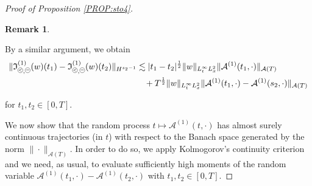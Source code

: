 \documentclass[%
11pt,  reqno]{amsart}
\newcommand{\pe}{\mathbin{\scaleobj{0.7}{\tikz \draw (0,0) node[shape=circle,draw,inner sep=0pt,minimum size=8.5pt] {\scriptsize  $=$};}}}
\newcommand{\pl}{\mathbin{\scaleobj{0.7}{\tikz \draw (0,0) node[shape=circle,draw,inner sep=0pt,minimum size=8.5pt] {\scriptsize $<$};}}}
\newtheorem{remark}[theorem]{Remark}
\newcommand{\1}{\hspace{0.2mm}\text{I}\hspace{0.2mm}}
\newcommand{\noi}{\noindent}
\newcommand{\les}{\lesssim}
\newcommand{\If}{\mathfrak{I}}
\newcommand{\A}{\mathcal{A}}
\numberwithin{equation}{section}
\numberwithin{theorem}{section}
\begin{document}
\begin{proof}[Proof of Proposition \ref{PROP:sto4}]
\begin{remark}
\end{remark}



By a similar argument, 
 we obtain 
\begin{align}
\begin{split}
\|\If_{\pl, \pe}^{(1)}(w)(t_1) - \If_{\pl, \pe}^{(1)}(w)(t_2)\|_{H^{s_2 - 1}}
& \les 
|t_1 - t_2|^\frac{1}{2}  \|w\|_{L^\infty_t L^2_x} \|\A^{(1)} (t_1, \cdot)\|_{\A(T)}\\
& \hphantom{X}
+ T^\frac{1}{2}  \|w\|_{L^\infty_t L^2_x} \|\A^{(1)} (t_1, \cdot)-\A^{(1)} (s_2, \cdot)\|_{\A(T)}
\end{split}
\label{Aop2}
\end{align}

\noi
for $t_1,t_2\in[0,T]$.

We  now  show that the random process $t \mapsto \A^{(1)} (t, \cdot)$ has almost surely 
 continuous trajectories (in $t$) with respect to  the Banach space generated by the norm $\|\cdot\|_{\A(T)}$.  
 In order to do so,  we apply Kolmogorov's continuity criterion 
 and we need, as usual, to evaluate sufficiently high  moments of the random variable $\A^{(1)} (t_1, \cdot)-\A^{(1)} (t_2, \cdot)$ with $t_1,t_2\in[0,T]$.


\end{proof}
\end{document}
